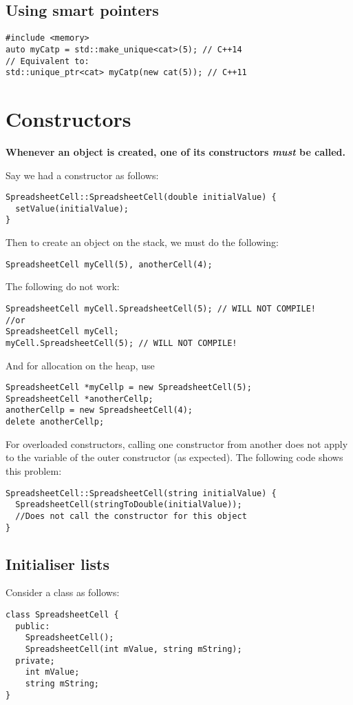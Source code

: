 \documentclass[a4paper,12pt,oneside]{book}
\begin{document}
{\subsection{Using smart pointers}
\begin{lstlisting}
#include <memory>
auto myCatp = std::make_unique<cat>(5); // C++14
// Equivalent to:
std::unique_ptr<cat> myCatp(new cat(5)); // C++11
\end{lstlisting}

\section{Constructors}
\textbf{Whenever an object is created, one of its constructors \emph{must} be called.}

Say we had a constructor as follows:
\begin{lstlisting}
SpreadsheetCell::SpreadsheetCell(double initialValue) {
  setValue(initialValue);
}
\end{lstlisting}
Then to create an object on the stack, we must do the following:
\begin{lstlisting}
SpreadsheetCell myCell(5), anotherCell(4);
\end{lstlisting}
The following do not work:
\begin{lstlisting}
SpreadsheetCell myCell.SpreadsheetCell(5); // WILL NOT COMPILE!
//or
SpreadsheetCell myCell;
myCell.SpreadsheetCell(5); // WILL NOT COMPILE!
\end{lstlisting}

And for allocation on the heap, use
\begin{lstlisting}
SpreadsheetCell *myCellp = new SpreadsheetCell(5);
SpreadsheetCell *anotherCellp;
anotherCellp = new SpreadsheetCell(4);
delete anotherCellp;
\end{lstlisting}

For overloaded constructors, calling one constructor from another does not apply to the variable of the outer constructor (as expected). The following code shows this problem:

\begin{lstlisting}
SpreadsheetCell::SpreadsheetCell(string initialValue) {
  SpreadsheetCell(stringToDouble(initialValue));
  //Does not call the constructor for this object
}
\end{lstlisting}

\subsection{Initialiser lists}
Consider a class as follows:
\begin{lstlisting}
class SpreadsheetCell {
  public:
    SpreadsheetCell();
    SpreadsheetCell(int mValue, string mString);
  private;
    int mValue;
    string mString;
}
\end{lstlisting}

}
\end{document}
